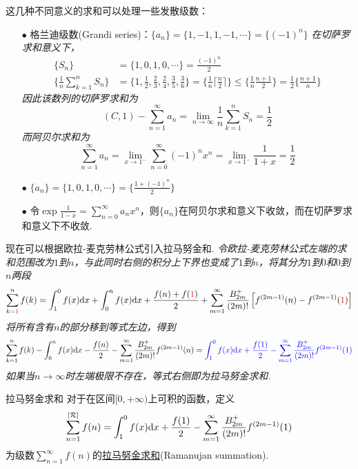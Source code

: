 \documentclass[main.tex]{subfiles}
\begin{document}
这几种不同意义的求和可以处理一些发散级数：
\begin{itemize}
    \item [\(\bullet\)] 格兰迪级数(Grandi series)：\(\{a_n\} = \{1,-1,1,-1,\cdots\} = \{(-1)^n\}\)
    \textit{在切萨罗求和意义下，}
    \begin{align*}
        \{S_n\} &= \{1,0,1,0,\cdots\} = \frac{(-1)^n}{2} \\
        \{\frac{1}{n}\sum_{k=1}^nS_n\} &= \{1, \frac{1}{2}, \frac{2}{3}, \frac{2}{4}, \frac{3}{5}, \frac{3}{6}\} = \{\frac{1}{n}\lceil \frac{n}{2} \rceil\} \leq \{\frac{1}{n}\frac{n+1}{2}\} = \frac{1}{2}\{\frac{n+1}{n}\}
    \end{align*}
    \textit{因此该数列的切萨罗求和为}
    \[(C,1)-\sum_{n=1}^{\infty}a_n = \lim_{n \to \infty} \frac{1}{n}\sum_{k=1}^nS_n = \frac{1}{2}\]
    \textit{而阿贝尔求和为}
    \[\sum_{n=1}^{\infty}a_n = \lim_{x \to 1^-}\sum_{n=0}^{\infty}(-1)^nx^n = \lim_{x \to 1^-} \frac{1}{1+x} = \frac{1}{2}\]
    \item [\(\bullet\)] \(\displaystyle{\{a_n\} = \{1,0,1,0,\cdots\} = \{\frac{1+(-1)^n}{2}\}}\)
    \item [\(\bullet\)] 令\(\displaystyle{\exp\frac{1}{1-x} = \sum_{n=0}^{\infty} a_nx^n}\)，则\(\{a_n\}\)在阿贝尔求和意义下收敛，而在切萨罗求和意义下不收敛.
\end{itemize}

现在可以根据欧拉-麦克劳林公式引入拉马努金和.
\newline
\textit{
    令欧拉-麦克劳林公式左端的求和范围改为\(1\)到\(n\)，与此同时右侧的积分上下界也变成了\(1\)到\(n\)，将其分为\(1\)到\(0\)和\(0\)到\(n\)两段
}
\[\sum_{k={\color{red}1}}^{n}f(k) = \int_1^0f(x){\rm d}x + \int_0^nf(x){\rm d}x + \frac{f(n)+f({\color{red}1})}{2} + \sum_{m=1}^{\infty}\frac{B_{2m}^+}{(2m)!}\left[f^{(2m-1)}(n) - f^{(2m-1)}({\color{red}1})\right]\]
\textit{
    将所有含有\(n\)的部分移到等式左边，得到
}
\[\sum_{k=1}^{n}f(k) - \int_{0}^nf(x){\rm d}x  - \frac{f(n)}{2}  - \sum_{m=1}^{\infty}\frac{B_{2m}^+}{(2m)!}f^{(2m-1)}(n) = {\color{blue}\int_1^0f(x){\rm d}x + \frac{f(1)}{2} - \sum_{m=1}^{\infty}\frac{B_{2m}^+}{(2m)!}f^{(2m-1)}(1)}\]
\textit{如果当\(n\to\infty\)时左端极限不存在，等式右侧即为拉马努金求和.}
\begin{definition}{拉马努金求和}
    对于在区间\([0,+\infty)\)上可积的函数，定义
    \[\sum_{n=1}^{[\mathcal{R}]}f(n) = \int_1^0f(x){\rm d}x + \frac{f(1)}{2} - \sum_{m=1}^{\infty}\frac{B_{2m}^+}{(2m)!}f^{(2m-1)}(1)\]
    为级数\(\displaystyle{\sum_{n=1}^{\infty}f(n)}\)的\uline{拉马努金求和}(Ramanujan summation).
\end{definition}
\end{document}
